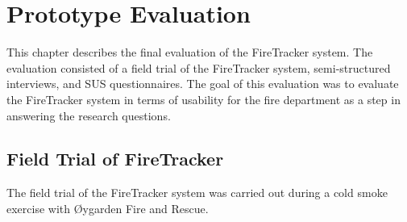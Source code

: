 \documentclass[../Main/thesis.tex]{subfiles}
\begin{document}
\chapter{Prototype Evaluation}
\label{ch:evaluation}
This chapter describes the final evaluation of the FireTracker system.
The evaluation consisted of a field trial of the FireTracker system, semi-structured interviews, and SUS questionnaires.
The goal of this evaluation was to evaluate the FireTracker system in terms of usability for the fire department as a step in answering the research questions.

%

\section{Field Trial of FireTracker}
The field trial of the FireTracker system was carried out during a cold smoke exercise with Øygarden Fire and Rescue.
\end{document}
